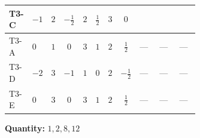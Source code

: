 \documentclass[8pt]{article}
\begin{document}
\begin{landscape}
\begin{longtable}{@{}llcccccc >{\raggedright\arraybackslash}p{0.21\linewidth} >{\raggedright\arraybackslash}p{0.21\linewidth} >{\raggedright\arraybackslash}p{0.21\linewidth}@{}}
T3-C & $-1$ & $2$ & $-\frac{1}{2}$ & $2$ & $\frac{1}{2}$ & $3$ & $0$ & \scriptsize\adjustbox{max width=\linewidth}{$\begin{gathered} \frac{lambda12Inv2 \overline{y_{1}} \overline{y_{2}}}{6 MF}\end{gathered}$} & \scriptsize\adjustbox{max width=\linewidth}{$\begin{gathered} \frac{\sqrt{3} g_{2}^{2} \overline{y_{1}} \overline{y_{2}}}{8 MF}\end{gathered}$} & \scriptsize\adjustbox{max width=\linewidth}{$\begin{gathered} - \frac{\sqrt{3} ye \overline{y_{1}} \overline{y_{2}} \overline{ye}}{24 MF}\end{gathered}$} \\
\midrule
T3-A & $0$ & $1$ & $0$ & $3$ & $1$ & $2$ & $\frac{1}{2}$ & --- & --- & --- \\
\midrule
T3-D & $-2$ & $3$ & $-1$ & $1$ & $0$ & $2$ & $-\frac{1}{2}$ & --- & --- & --- \\
\midrule
T3-E & $0$ & $3$ & $0$ & $3$ & $1$ & $2$ & $\frac{1}{2}$ & --- & --- & --- \\
\midrule
\bottomrule
\end{longtable}
\clearpage
\noindent\textbf{Quantity: }$\mathrm{1,2,8,12}$\par\smallskip

\end{landscape}
\end{document}

